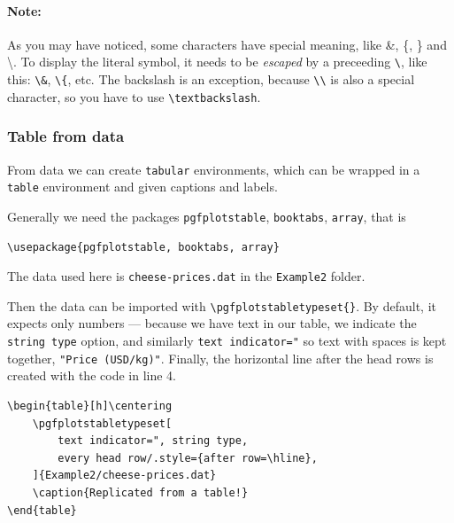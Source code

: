 \paragraph{Note:} As you may have noticed, some characters have special meaning, like \&, \{, \} and \textbackslash. To display the literal symbol, it needs to be \emph{escaped} by a preceeding \verb|\|, like this: \verb|\&|, \verb|\{|, etc. The backslash is an exception, because \verb|\\| is also a special character, so you have to use \verb|\textbackslash|.

\subsubsection{Table from data}
From data we can create \texttt{tabular} environments, which can be wrapped in a \texttt{table} environment and given captions and labels.

Generally we need the packages \texttt{pgfplotstable}, \texttt{booktabs}, \texttt{array}, that is
\begin{lstlisting}
\usepackage{pgfplotstable, booktabs, array}
\end{lstlisting}

The data used here is \texttt{cheese-prices.dat} in the \texttt{Example2} folder.


Then the data can be imported with \verb|\pgfplotstabletypeset{}|.
By default, it expects only numbers --- because we have text in our table, we indicate the \texttt{string type} option, and similarly \verb|text indicator="| so text with spaces is kept together, \verb|"Price (USD/kg)"|. 
Finally, the horizontal line after the head rows is created with the code in line 4.
\begin{lstlisting}
\begin{table}[h]\centering
    \pgfplotstabletypeset[
        text indicator=", string type,
        every head row/.style={after row=\hline},
    ]{Example2/cheese-prices.dat}
    \caption{Replicated from a table!}
\end{table}     
\end{lstlisting}

\begin{table}[h]\centering
    \caption{Replicated from a table!}
\end{table}     

